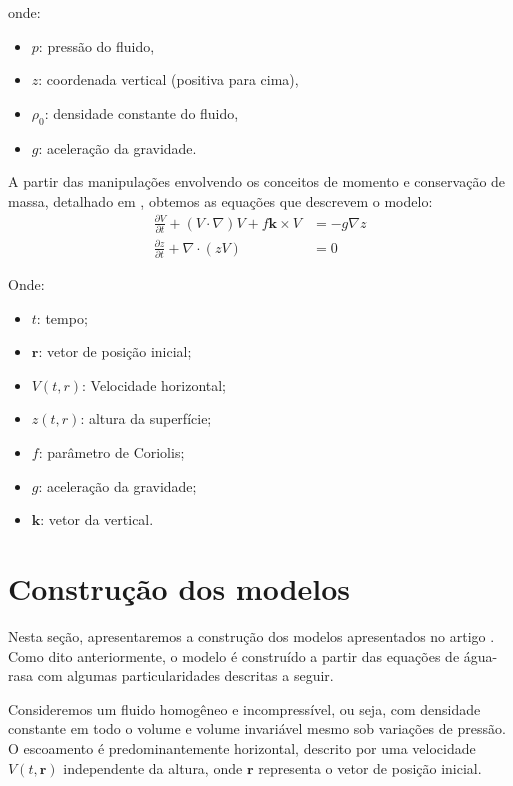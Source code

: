 onde:
\begin{itemize}
    \item $p$: pressão do fluido,
    \item $z$: coordenada vertical (positiva para cima),
    \item $\rho_0$: densidade constante do fluido,
    \item $g$: aceleração da gravidade.
\end{itemize}

A partir das manipulações envolvendo os conceitos de momento e conservação de massa, detalhado em \citet{Vallis2017}, obtemos as equações que descrevem o modelo: 
\begin{align}
	\frac{\partial V}{\partial t} + (V \cdot \nabla)V + f \mathbf{k} \times V & = -g \nabla z \label{eq:agua-rasa-1} \\
	\frac{\partial z}{\partial t} + \nabla \cdot (z V)                        & = 0 \label{eq:agua-rasa-2}    
\end{align}

Onde:
\begin{itemize}
    \item $t$: tempo;
    \item $\mathbf{r}$: vetor de posição inicial;
	\item $V(t,r)$: Velocidade horizontal;
	\item $z(t,r)$: altura da superfície;
	\item $f$: parâmetro de Coriolis;
	\item $g$: aceleração da gravidade;
	\item $\mathbf{k}$: vetor da vertical.
\end{itemize}

\section{Construção dos modelos} \label{sec:ch01_construcao_do_modelo}
Nesta seção, apresentaremos a construção dos modelos apresentados no artigo \citet{Lorenz1980}. Como dito anteriormente, o modelo é construído a partir das equações de água-rasa com algumas particularidades descritas a seguir. 

Consideremos um fluido homogêneo e incompressível, ou seja, com densidade constante em todo o volume e volume invariável mesmo sob variações de pressão. O escoamento é predominantemente horizontal, descrito por uma velocidade $V(t, \mathbf{r})$ independente da altura, onde $\mathbf{r}$ representa o vetor de posição inicial.

